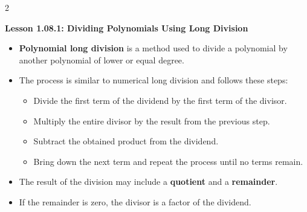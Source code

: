 2\begin{center}
\textbf{Lesson 1.08.1: Dividing Polynomials Using Long Division}
\end{center}

\vspace*{-1.5ex}

\begin{itemize}
    \item \textbf{Polynomial long division} is a method used to divide a polynomial by another polynomial of lower or equal degree.
    \item The process is similar to numerical long division and follows these steps:
          \begin{itemize}
              \item Divide the first term of the dividend by the first term of the divisor.
              \item Multiply the entire divisor by the result from the previous step.
              \item Subtract the obtained product from the dividend.
              \item Bring down the next term and repeat the process until no terms remain.
          \end{itemize}
    \item The result of the division may include a \textbf{quotient} and a \textbf{remainder}.
    \item If the remainder is zero, the divisor is a factor of the dividend.
\end{itemize}
